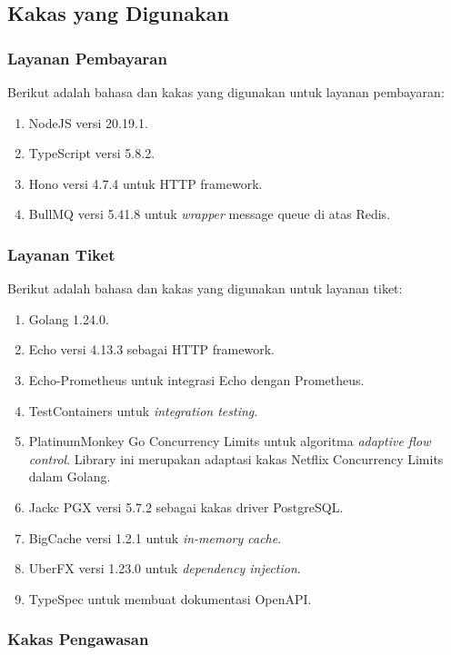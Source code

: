 \subsection{Kakas yang Digunakan}

\subsubsection{Layanan Pembayaran}

Berikut adalah bahasa dan kakas yang digunakan untuk layanan pembayaran:

\begin{enumerate}
    \item NodeJS versi 20.19.1.
    \item TypeScript versi 5.8.2.
    \item Hono versi 4.7.4 untuk HTTP framework.
    \item BullMQ versi 5.41.8 untuk \textit{wrapper} message queue di atas Redis.
\end{enumerate}

\subsubsection{Layanan Tiket}

Berikut adalah bahasa dan kakas yang digunakan untuk layanan tiket:

\begin{enumerate}
    \item Golang 1.24.0.
    \item Echo versi 4.13.3 sebagai HTTP framework.
    \item Echo-Prometheus untuk integrasi Echo dengan Prometheus.
    \item TestContainers untuk \textit{integration testing}.
    \item PlatinumMonkey Go Concurrency Limits untuk algoritma \textit{adaptive flow control}. Library ini merupakan adaptasi kakas Netflix Concurrency Limits dalam Golang.
    \item Jackc PGX versi 5.7.2 sebagai kakas driver PostgreSQL.
    \item BigCache versi 1.2.1 untuk \textit{in-memory cache}.
    \item UberFX versi 1.23.0 untuk \textit{dependency injection}.
    \item TypeSpec untuk membuat dokumentasi OpenAPI.
\end{enumerate}

\subsubsection{Kakas Pengawasan}

